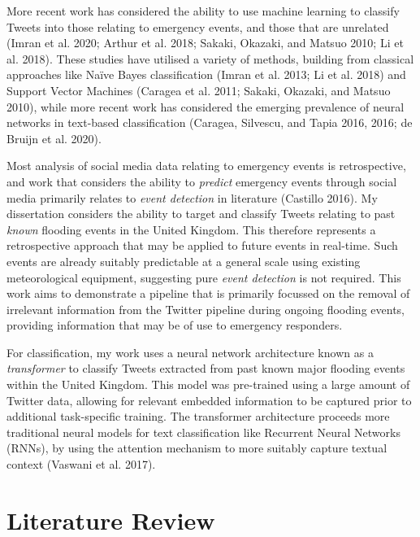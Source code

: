 \documentclass[a4paper, notitlepage]{extreport}
\begin{document}
More recent work has considered the ability to use machine learning to
classify Tweets into those relating to emergency events, and those that
are unrelated (Imran et al. 2020; Arthur et al. 2018; Sakaki, Okazaki,
and Matsuo 2010; Li et al. 2018). These studies have utilised a variety
of methods, building from classical approaches like Naïve Bayes
classification (Imran et al. 2013; Li et al. 2018) and Support Vector
Machines (Caragea et al. 2011; Sakaki, Okazaki, and Matsuo 2010), while
more recent work has considered the emerging prevalence of neural
networks in text-based classification (Caragea, Silvescu, and Tapia
2016, 2016; de Bruijn et al. 2020).

Most analysis of social media data relating to emergency events is
retrospective, and work that considers the ability to \emph{predict}
emergency events through social media primarily relates to \emph{event
detection} in literature (Castillo 2016). My dissertation considers the
ability to target and classify Tweets relating to past \emph{known}
flooding events in the United Kingdom. This therefore represents a
retrospective approach that may be applied to future events in
real-time. Such events are already suitably predictable at a general
scale using existing meteorological equipment, suggesting pure
\emph{event detection} is not required. This work aims to demonstrate a
pipeline that is primarily focussed on the removal of irrelevant
information from the Twitter pipeline during ongoing flooding events,
providing information that may be of use to emergency responders.

For classification, my work uses a neural network architecture known as
a \emph{transformer} to classify Tweets extracted from past known major
flooding events within the United Kingdom. This model was pre-trained
using a large amount of Twitter data, allowing for relevant embedded
information to be captured prior to additional task-specific training.
The transformer architecture proceeds more traditional neural models for
text classification like Recurrent Neural Networks (RNNs), by using the
attention mechanism to more suitably capture textual context (Vaswani et
al. 2017).

\chapter{Literature Review}
\end{document}
